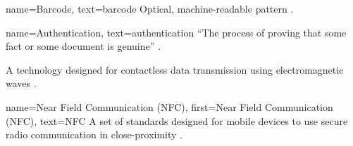 {
  name={Barcode},
  text={barcode}
}
{
  Optical, machine-readable pattern
  \parencite{whatIsABarcode}.
}

{
  name={Authentication},
  text=authentication
}
{
  \enquote{The process of proving that some fact or some
    document is genuine} \parencite{whatIsAuth}.
}

{
  A technology designed for contactless data transmission
  using electromagnetic waves \parencite{whatIsRfid}.
}

{
  name={Near Field Communication (NFC)},
  first={Near Field Communication (NFC)},
  text={NFC}
}
{
  A set of standards designed for mobile devices to use
  secure radio communication in close-proximity \cite{nfc}.
}